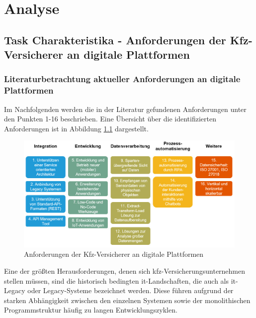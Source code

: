 \chapter{Analyse}
\section{Task Charakteristika - Anforderungen der Kfz-Versicherer an digitale Plattformen}

\subsection{Literaturbetrachtung aktueller Anforderungen an digitale Plattformen}


Im Nachfolgenden werden die in der Literatur gefundenen Anforderungen unter den Punkten 1-16 beschrieben. Eine Übersicht über die identifizierten Anforderungen ist in Abbildung \ref{fig:PPAnf} dargestellt.

\begin{figure}[h]
    \centering
    \includegraphics[width=1\textwidth]{img/PP_Anforderungen.jpg}
    \caption[Anforderungen der Kfz-Versicherer an digitale Plattformen]{Anforderungen der Kfz-Versicherer an digitale Plattformen\autocite{PPAnf}}
    \label{fig:PPAnf}
\end{figure}

Eine der größten Herausforderungen, denen sich \ac{kfz}-Versicherungsunternehmen stellen müssen, sind die historisch bedingten \ac{it}-Landschaften, die auch als \ac{it}-Legacy oder Legacy-Systeme bezeichnet werden. Diese führen aufgrund der starken Abhängigkeit zwischen den einzelnen Systemen sowie der monolithischen Programmstruktur häufig zu langen Entwicklungszyklen. \autocite[Vgl.][S. 10-12]{GUNTER2020}

